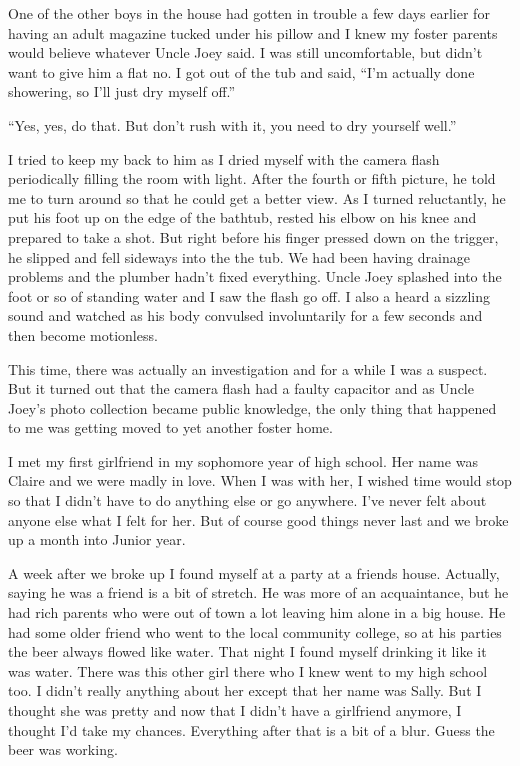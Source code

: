 \documentclass[11pt,letterpaper]{article}
\begin{document}
One of the other boys in the house had gotten in trouble a few days earlier for having an adult magazine tucked under his pillow and I knew my foster parents would believe whatever Uncle Joey said. I was still uncomfortable, but didn't want to give him a flat no. I got out of the tub and said, ``I'm actually done showering, so I'll just dry myself off.''

``Yes, yes, do that. But don't rush with it, you need to dry yourself well.''

I tried to keep my back to him as I dried myself with the camera flash periodically filling the room with light. After the fourth or fifth picture, he told me to turn around so that he could get a better view. As I turned reluctantly, he put his foot up on the edge of the bathtub, rested his elbow on his knee and prepared to take a shot. But right before his finger pressed down on the trigger, he slipped and fell sideways into the the tub. We had been having drainage problems and the plumber hadn't fixed everything. Uncle Joey splashed into the foot or so of standing water and I saw the flash go off. I also a heard a sizzling sound and watched as his body convulsed involuntarily for a few seconds and then become motionless.

This time, there was actually an investigation and for a while I was a suspect. But it turned out that the camera flash had a faulty capacitor and as Uncle Joey's photo collection became public knowledge, the only thing that happened to me was getting moved to yet another foster home.


I met my first girlfriend in my sophomore year of high school. Her name was Claire and we were madly in love. When I was with her, I wished time would stop so that I didn't have to do anything else or go anywhere. I've never felt about anyone else what I felt for her. But of course good things never last and we broke up a month into Junior year.

A week after we broke up I found myself at a party at a friends house. Actually, saying he was a friend is a bit of stretch. He was more of an acquaintance, but he had rich parents who were out of town a lot leaving him alone in a big house. He had some older friend who went to the local community college, so at his parties the beer always flowed like water. That night I found myself drinking it like it was water. There was this other girl there who I knew went to my high school too. I didn't really anything about her except that her name was Sally. But I thought she was pretty and now that I didn't have a girlfriend anymore, I thought I'd take my chances. Everything after that is a bit of a blur. Guess the beer was working.
\end{document}
